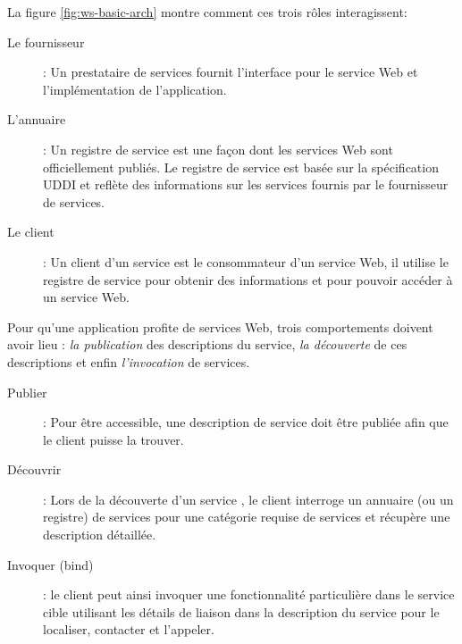   


  La figure \ref{fig:ws-basic-arch} montre comment ces trois rôles
  interagissent:

  \renewcommand{\descriptionlabel}[1]{\hspace{0.5cm}\textbullet~\textsf{#1}}
  \begin{description}
  \item[Le fournisseur]: Un prestataire de services fournit
    l'interface pour le service Web et l'implémentation de
    l'application.

  \item[L'annuaire]: Un registre de service est une façon dont les
    services Web sont officiellement publiés. Le registre de service
    est basée sur la spécification \textsc{UDDI} et reflète des
    informations sur les services fournis par le fournisseur de
    services.

  \item[Le client]: Un client d'un service est le consommateur d'un
    service Web, il utilise le registre de service pour obtenir des
    informations et pour pouvoir accéder à un service Web.
  \end{description}

  Pour qu'une application profite de services Web, trois comportements
  doivent avoir lieu : \textit{la publication} des descriptions du
  service, \textit{la découverte} de ces descriptions et enfin
  \textit{l'invocation} de services.

  \renewcommand{\descriptionlabel}[1]{\hspace{0.5cm}\textbullet~\textsf{#1}}
  \begin{description}
  \item[Publier]: Pour être accessible, une description de service
    doit être publiée afin que le client puisse la trouver.

  \item[Découvrir]: Lors de la découverte d'un service , le client
    interroge un annuaire (ou un registre) de services pour une
    catégorie requise de services et récupère une description
    détaillée.

  \item[Invoquer (bind)]: le client peut ainsi invoquer une
    fonctionnalité particulière dans le service cible utilisant les
    détails de liaison dans la description du service pour le
    localiser, contacter et l'appeler.
  \end{description}
  \enddescription

